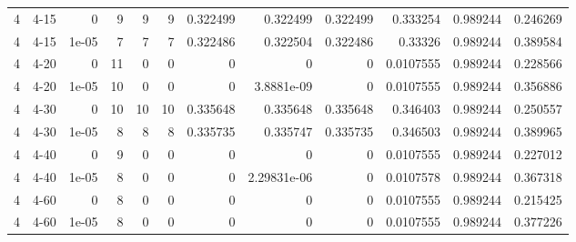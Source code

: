 \begin{tabular}{rlrrrrrrrrrr}
     4 & 4-15   &      0     &           9 &                 9 &                 9 &     0.322499    &     0.322499    &      0.322499    &        0.333254  &               0.989244 &           0.246269 \\
     4 & 4-15   &      1e-05 &           7 &                 7 &                 7 &     0.322486    &     0.322504    &      0.322486    &        0.33326   &               0.989244 &           0.389584 \\
     4 & 4-20   &      0     &          11 &                 0 &                 0 &     0           &     0           &      0           &        0.0107555 &               0.989244 &           0.228566 \\
     4 & 4-20   &      1e-05 &          10 &                 0 &                 0 &     0           &     3.8881e-09  &      0           &        0.0107555 &               0.989244 &           0.356886 \\
     4 & 4-30   &      0     &          10 &                10 &                10 &     0.335648    &     0.335648    &      0.335648    &        0.346403  &               0.989244 &           0.250557 \\
     4 & 4-30   &      1e-05 &           8 &                 8 &                 8 &     0.335735    &     0.335747    &      0.335735    &        0.346503  &               0.989244 &           0.389965 \\
     4 & 4-40   &      0     &           9 &                 0 &                 0 &     0           &     0           &      0           &        0.0107555 &               0.989244 &           0.227012 \\
     4 & 4-40   &      1e-05 &           8 &                 0 &                 0 &     0           &     2.29831e-06 &      0           &        0.0107578 &               0.989244 &           0.367318 \\
     4 & 4-60   &      0     &           8 &                 0 &                 0 &     0           &     0           &      0           &        0.0107555 &               0.989244 &           0.215425 \\
     4 & 4-60   &      1e-05 &           8 &                 0 &                 0 &     0           &     0           &      0           &        0.0107555 &               0.989244 &           0.377226 \\
\hline
\end{tabular}
